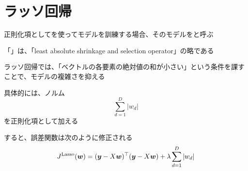 \documentclass[../../../topic_machine-learning]{subfiles}
\begin{document}
\sectionline
\section{ラッソ回帰}

正則化項としてを使ってモデルを訓練する場合、そのモデルをと呼ぶ

「」は、「least absolute shrinkage and selection operator」の略である

\br

ラッソ回帰では、「ベクトルの各要素の絶対値の和が小さい」という条件を課すことで、モデルの複雑さを抑える

\br

具体的には、ノルム
\begin{equation*}
  \sum_{d=1}^D |w_d|
\end{equation*}
を正則化項として加える

\br

すると、誤差関数は次のように修正される
\begin{equation*}
  J^{\text{Lasso}}(\vb*{w}) = (\vb*{y} - X\vb*{w})^\top (\vb*{y} - X\vb*{w}) + \lambda \sum_{d=1}^D |w_d|
\end{equation*}
\end{document}
